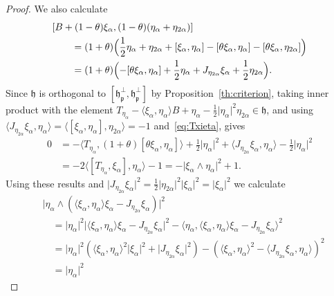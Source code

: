 \documentclass[10pt,a4paper]{amsart}
\newcommand{\g}{\mathfrak}
\begin{document}
\begin{proof}
We also calculate
\begin{equation}\label{eq:bracket-spperp}
\begin{aligned}
&{}[B+(1-\theta)\xi_\alpha,(1-\theta)(\eta_\alpha+\eta_{2\alpha})]\\
&\qquad{}=(1+\theta)\Bigl(\frac{1}{2}\eta_\alpha+\eta_{2\alpha}
+[\xi_\alpha,\eta_\alpha]-[\theta\xi_\alpha,\eta_\alpha]
-[\theta\xi_\alpha,\eta_{2\alpha}]\Bigr)\\
&\qquad{}=(1+\theta)\Bigl(-[\theta\xi_\alpha,\eta_\alpha]
+\frac{1}{2}\eta_\alpha+J_{\eta_{2\alpha}}\xi_\alpha+\frac{1}{2}\eta_{2\alpha}\Bigr).
\end{aligned}
\end{equation}
Since $\g{h}$ is orthogonal to $[\g{h}_{\g{p}}^\perp,\g{h}_{\g{p}}^\perp]$ by Proposition~\ref{th:criterion}, taking inner product with the element $T_{\eta_\alpha}-\langle\xi_\alpha,\eta_\alpha\rangle B+\eta_\alpha-\frac{1}{2}\lvert\eta_\alpha\rvert^2\eta_{2\alpha}\in\g{h}$,
and using $\langle J_{\eta_{2\alpha}}\xi_\alpha,\eta_\alpha\rangle=\langle[\xi_\alpha,\eta_\alpha],\eta_{2\alpha}\rangle=-1$ and~\eqref{eq:Txieta}, gives
\begin{align*}
0&{}=-\langle T_{\eta_\alpha},(1+\theta)[\theta\xi_\alpha,\eta_\alpha]\rangle
+\frac{1}{2}\lvert\eta_\alpha\rvert^2
+\langle J_{\eta_{2\alpha}}\xi_\alpha,\eta_\alpha\rangle
-\frac{1}{2}\lvert\eta_{\alpha}\rvert^2\\
&{}=-2\langle[T_{\eta_{\alpha}},\xi_\alpha],\eta_\alpha\rangle-1
=-\lvert\xi_\alpha\wedge\eta_\alpha\rvert^2+1.
\end{align*}
Using these results and 
$\lvert J_{\eta_{2\alpha}}\xi_\alpha\rvert^2 =\frac{1}{2}\lvert\eta_{2\alpha}\rvert^2\lvert\xi_\alpha\rvert^2 =\lvert\xi_\alpha\rvert^2$ we calculate
\begin{align*}
&\lvert\eta_\alpha\wedge(\langle\xi_\alpha,\eta_\alpha\rangle\xi_\alpha-J_{\eta_{2\alpha}}\xi_\alpha)\lvert^2\\
&\quad{}=\lvert\eta_\alpha\rvert^2
\lvert\langle\xi_\alpha,\eta_\alpha\rangle\xi_\alpha-J_{\eta_{2\alpha}}\xi_\alpha\rvert^2
-\langle\eta_\alpha,\langle\xi_\alpha,\eta_\alpha\rangle\xi_\alpha-J_{\eta_{2\alpha}}\xi_\alpha\rangle^2\\
&\quad{}=\lvert\eta_\alpha\rvert^2
(\langle\xi_\alpha,\eta_\alpha\rangle^2\lvert\xi_\alpha\rvert^2+\lvert J_{\eta_{2\alpha}}\xi_\alpha\rvert^2)
-(\langle\xi_\alpha,\eta_\alpha\rangle^2-\langle J_{\eta_{2\alpha}}\xi_\alpha,\eta_\alpha\rangle)^2\\
&\quad{}=\lvert\eta_\alpha\rvert^2

\end{align*}
\end{proof}
\end{document}
